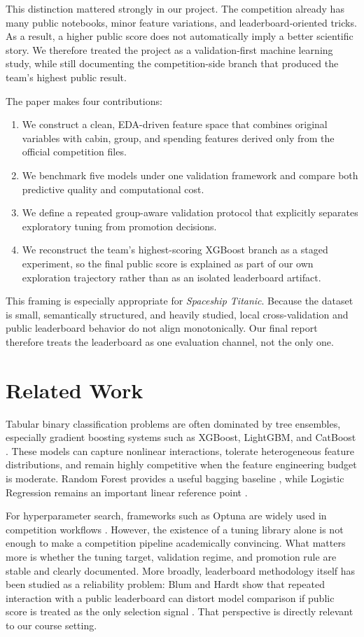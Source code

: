 \documentclass[conference]{IEEEtran}
\begin{document}
This distinction mattered strongly in our project. The competition already has many public notebooks, minor feature variations, and leaderboard-oriented tricks. As a result, a higher public score does not automatically imply a better scientific story. We therefore treated the project as a validation-first machine learning study, while still documenting the competition-side branch that produced the team's highest public result.

The paper makes four contributions:
\begin{enumerate}
\item We construct a clean, EDA-driven feature space that combines original variables with cabin, group, and spending features derived only from the official competition files.
\item We benchmark five models under one validation framework and compare both predictive quality and computational cost.
\item We define a repeated group-aware validation protocol that explicitly separates exploratory tuning from promotion decisions.
\item We reconstruct the team's highest-scoring XGBoost branch as a staged experiment, so the final public score is explained as part of our own exploration trajectory rather than as an isolated leaderboard artifact.
\end{enumerate}

This framing is especially appropriate for \emph{Spaceship Titanic}. Because the dataset is small, semantically structured, and heavily studied, local cross-validation and public leaderboard behavior do not align monotonically. Our final report therefore treats the leaderboard as one evaluation channel, not the only one.

\section{Related Work}
Tabular binary classification problems are often dominated by tree ensembles, especially gradient boosting systems such as XGBoost, LightGBM, and CatBoost \cite{xgboost,lightgbm,catboost}. These models can capture nonlinear interactions, tolerate heterogeneous feature distributions, and remain highly competitive when the feature engineering budget is moderate. Random Forest provides a useful bagging baseline \cite{rf}, while Logistic Regression remains an important linear reference point \cite{sklearn}.

For hyperparameter search, frameworks such as Optuna are widely used in competition workflows \cite{optuna}. However, the existence of a tuning library alone is not enough to make a competition pipeline academically convincing. What matters more is whether the tuning target, validation regime, and promotion rule are stable and clearly documented. More broadly, leaderboard methodology itself has been studied as a reliability problem: Blum and Hardt show that repeated interaction with a public leaderboard can distort model comparison if public score is treated as the only selection signal \cite{ladder}. That perspective is directly relevant to our course setting.
\end{document}
